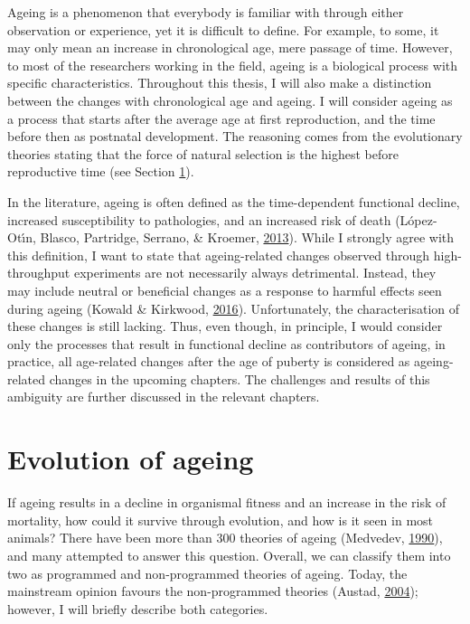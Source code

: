 \documentclass[12pt,twoside]{unicam}
\begin{document}
Ageing is a phenomenon that everybody is familiar with through either observation or experience, yet it is difficult to define. For example, to some, it may only mean an increase in chronological age, mere passage of time. However, to most of the researchers working in the field, ageing is a biological process with specific characteristics. Throughout this thesis, I will also make a distinction between the changes with chronological age and ageing. I will consider ageing as a process that starts after the average age at first reproduction, and the time before then as postnatal development. The reasoning comes from the evolutionary theories stating that the force of natural selection is the highest before reproductive time (see Section \ref{introEvoAgeing}).

In the literature, ageing is often defined as the time-dependent functional decline, increased susceptibility to pathologies, and an increased risk of death (López-Otı́n, Blasco, Partridge, Serrano, \& Kroemer, \protect\hyperlink{ref-Lopez-Otin2013}{2013}). While I strongly agree with this definition, I want to state that ageing-related changes observed through high-throughput experiments are not necessarily always detrimental. Instead, they may include neutral or beneficial changes as a response to harmful effects seen during ageing (Kowald \& Kirkwood, \protect\hyperlink{ref-Kowald2016}{2016}). Unfortunately, the characterisation of these changes is still lacking. Thus, even though, in principle, I would consider only the processes that result in functional decline as contributors of ageing, in practice, all age-related changes after the age of puberty is considered as ageing-related changes in the upcoming chapters. The challenges and results of this ambiguity are further discussed in the relevant chapters.

\hypertarget{introEvoAgeing}{%
\section{Evolution of ageing}\label{introEvoAgeing}}

If ageing results in a decline in organismal fitness and an increase in the risk of mortality, how could it survive through evolution, and how is it seen in most animals? There have been more than 300 theories of ageing (Medvedev, \protect\hyperlink{ref-Medvedev1990}{1990}), and many attempted to answer this question. Overall, we can classify them into two as programmed and non-programmed theories of ageing. Today, the mainstream opinion favours the non-programmed theories (Austad, \protect\hyperlink{ref-Austad2004}{2004}); however, I will briefly describe both categories.
\end{document}
